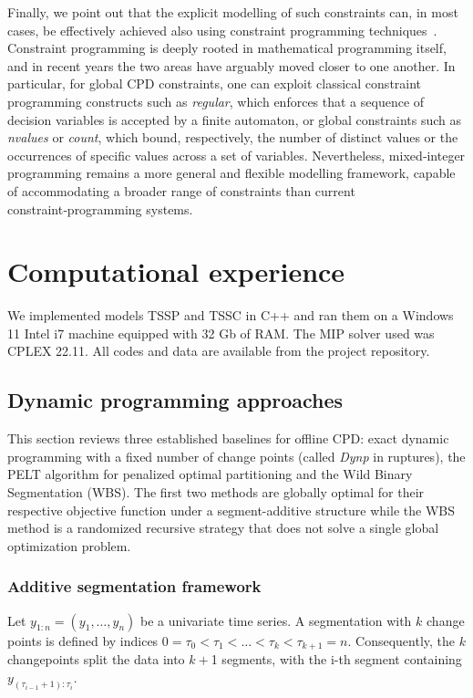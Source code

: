 \documentclass[preprints,article,submit,pdftex,moreauthors]{Definitions/mdpi}
\begin{document}
Finally, we point out that the explicit modelling of such constraints can, in most cases, be effectively achieved also using constraint programming techniques \cite{RBW06}. Constraint programming is deeply rooted in mathematical programming itself, and in recent years the two areas have arguably moved closer to one another. In particular, for global CPD constraints, one can exploit classical constraint programming constructs such as {\it regular}, which enforces that a sequence of decision variables is accepted by a finite automaton, or global constraints such as {\it nvalues} or {\it count}, which bound, respectively, the number of distinct values or the occurrences of specific values across a set of variables. Nevertheless, mixed‑integer programming remains a more general and flexible modelling framework, capable of accommodating a broader range of constraints than current constraint‑programming systems.

\section{Computational experience} 			\label{sec:computation}

We implemented models TSSP and TSSC in C++ and ran them on a Windows 11 Intel i7 machine equipped with 32 Gb of RAM. The MIP solver used was CPLEX 22.11. All codes and data are available from the project repository.

\subsection{Dynamic programming approaches} \label{subsec:DPcodes}

This section reviews three established baselines for offline CPD: exact dynamic programming with a fixed number of change points (called {\it Dynp} in ruptures), the PELT algorithm for penalized optimal partitioning and the Wild Binary Segmentation (WBS).
The first two methods are globally optimal for their respective objective function under a segment-additive structure while the WBS method is a randomized recursive strategy that does not solve a single global optimization problem.

\subsubsection{Additive segmentation framework}

Let $y_{1:n} = (y_1,\dots,y_n)$ be a univariate time series. A segmentation with $k$ change points is defined by indices
$0 = \tau_0 < \tau_1 < \dots < \tau_k < \tau_{k+1} = n$.
Consequently, the $k$ changepoints split the data into $k + $1 segments, with the i-th segment containing $y_{(\tau_{i-1}+1):\tau_i}$.
\end{document}
